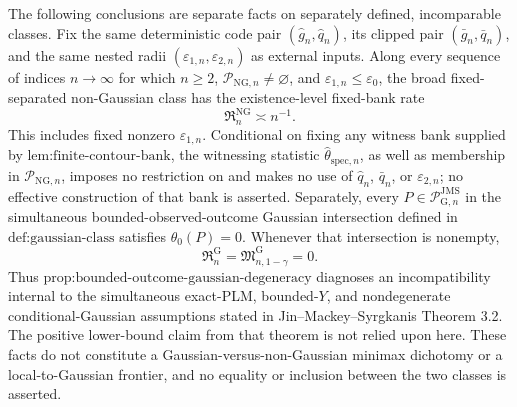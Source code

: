 The following conclusions are separate facts on separately defined, incomparable classes.  Fix the same deterministic code pair \((\widehat g_n,\widehat q_n)\), its clipped pair \((\bar g_n,\bar q_n)\), and the same nested radii \((\varepsilon_{1,n},\varepsilon_{2,n})\) as external inputs.  Along every sequence of indices \(n\to\infty\) for which \(n\ge2\), \(\mathcal P_{\mathrm{NG},n}\neq\varnothing\), and \(\varepsilon_{1,n}\le\varepsilon_0\), the broad fixed-separated non-Gaussian class has the existence-level fixed-bank rate
\[
 \mathfrak R_n^{\mathrm{NG}}\asymp n^{-1}.
\]
This includes fixed nonzero \(\varepsilon_{1,n}\).  Conditional on fixing any witness bank supplied by \(\text{lem:finite-contour-bank}\), the witnessing statistic \(\widehat\theta_{\mathrm{spec},n}\), as well as membership in \(\mathcal P_{\mathrm{NG},n}\), imposes no restriction on and makes no use of \(\widehat q_n\), \(\bar q_n\), or \(\varepsilon_{2,n}\); no effective construction of that bank is asserted.  Separately, every \(P\in\mathcal P_{\mathrm G,n}^{\mathrm{JMS}}\) in the simultaneous bounded-observed-outcome Gaussian intersection defined in \(\text{def:gaussian-class}\) satisfies \(\theta_0(P)=0\). Whenever that intersection is nonempty,
\[
 \mathfrak R_n^{\mathrm G}
 =\mathfrak M_{n,1-\gamma}^{\mathrm G}
 =0.
\]
Thus \(\text{prop:bounded-outcome-gaussian-degeneracy}\) diagnoses an incompatibility internal to the simultaneous exact-PLM, bounded-\(Y\), and nondegenerate conditional-Gaussian assumptions stated in Jin--Mackey--Syrgkanis Theorem 3.2. The positive lower-bound claim from that theorem is not relied upon here. These facts do not constitute a Gaussian-versus-non-Gaussian minimax dichotomy or a local-to-Gaussian frontier, and no equality or inclusion between the two classes is asserted.